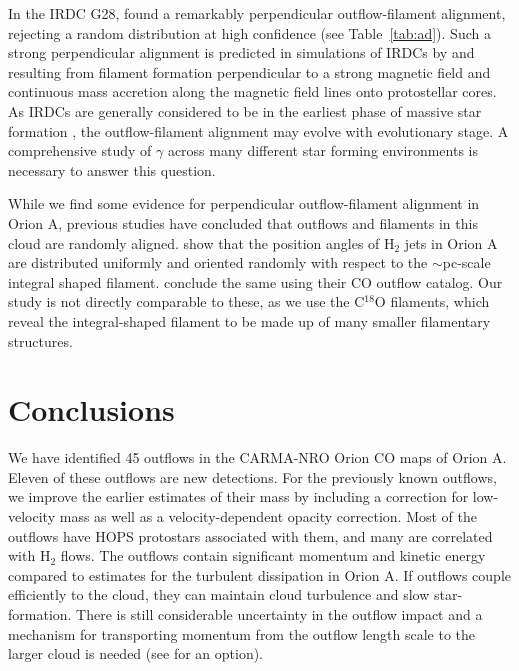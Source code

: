 \documentclass[twocolumn]{aastex63}
\begin{document}
In the IRDC G28, \citet{Kong19} found a remarkably perpendicular outflow-filament alignment, rejecting a random distribution at high confidence (see Table~\ref{tab:ad}). Such a strong perpendicular alignment is predicted in simulations of IRDCs by \citet{Li18} and \citet{Li19} resulting from filament formation perpendicular to a strong magnetic field and continuous mass accretion along the magnetic field lines onto protostellar cores. As IRDCs are generally considered to be in the earliest phase of massive star formation \citep{Rathborne06}, the outflow-filament alignment may evolve with evolutionary stage. A comprehensive study of $\gamma$ across many different star forming environments is necessary to answer this question.

While we find some evidence for perpendicular outflow-filament alignment in Orion A, previous studies have concluded that outflows and filaments in this cloud are randomly aligned. \citet{Davis09} show that the position angles of H$_2$ jets in Orion A are distributed uniformly and oriented randomly with respect to the $\sim$pc-scale integral shaped filament. \citet{Tanabe:submitted} conclude the same using their CO outflow catalog. Our study is not directly comparable to these, as we use the C$^18$O filaments, which reveal the integral-shaped filament to be made up of many smaller filamentary structures.


\section{Conclusions}\label{sec:conclusions}

We have identified 45 outflows in the CARMA-NRO Orion CO maps of Orion A. Eleven of these outflows are new detections. For the previously known outflows, we improve the earlier estimates of their mass by including a correction for low-velocity mass as well as a velocity-dependent opacity correction. Most of the outflows have HOPS protostars associated with them, and many are correlated with H$_2$ flows.
The outflows contain significant momentum and kinetic energy compared to estimates for the turbulent dissipation in Orion A. If outflows couple efficiently to the cloud, they can maintain cloud turbulence and slow star-formation. There is still considerable uncertainty in the outflow impact and a mechanism for transporting momentum from the outflow length scale to the larger cloud is needed (see \citealp{Offner18} for an option).
\end{document}

